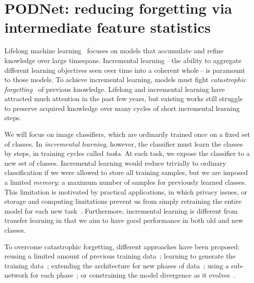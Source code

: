 \section{PODNet: reducing forgetting via intermediate feature statistics}

Lifelong machine
learning~\citep{robins1995catastrophicforgetting,french1999catastrophicforgetting,thrun1998lifelonglearning}
focuses on models that accumulate and refine knowledge over large timespans. Incremental learning
--\,the ability to aggregate different learning objectives seen over time into a coherent whole\,--
is paramount to those models. To achieve incremental learning, models must fight
\textit{catastrophic
    forgetting}~\citep{robins1995catastrophicforgetting,french1999catastrophicforgetting} of previous
knowledge. Lifelong and incremental learning have attracted much attention in the past few years,
but existing works still struggle to preserve acquired knowledge over many cycles of short
incremental learning steps.

We will focus on image classifiers, which are ordinarily trained once on a fixed set of classes. In
\textit{incremental learning}, however, the classifier must learn the classes by steps, in training
cycles called \textit{tasks}. At each task, we expose the classifier to a new set of classes.
Incremental learning would reduce trivially to ordinary classification if we were allowed to store
all training samples, but we are imposed a limited \textit{memory}: a maximum number of samples for
previously learned classes. This limitation is motivated by practical applications, in which privacy
issues, or storage and computing limitations prevent us from simply retraining the entire model for
each new task~\citep{li2018lwf,lomonaco2017core50}. Furthermore, incremental learning is different
from transfer learning in that we aim to have good performance in both old and new classes.

To overcome catastrophic forgetting, different approaches have been proposed: reusing a limited
amount of previous training data~\citep{rebuffi2017icarl,castro2018end_to_end_inc_learn}; learning
to generate the training data~\citep{kemker2018fearnet,shin2017deep_generative_replay}; extending
the architecture for new phases of
data~\citep{yoon2018dynamically_expandable_networks,li2019learning_to_grow}; using a sub-network for
each phase~\citep{fernando2017path_net,golkar2019neural_pruning}; or constraining the model
divergence as it
evolves~\citep{kirkpatrick2017ewc,lopezpaz2017gem,aljundi2018MemoryAwareSynapses,li2018lwf,rebuffi2017icarl,castro2018end_to_end_inc_learn}.


